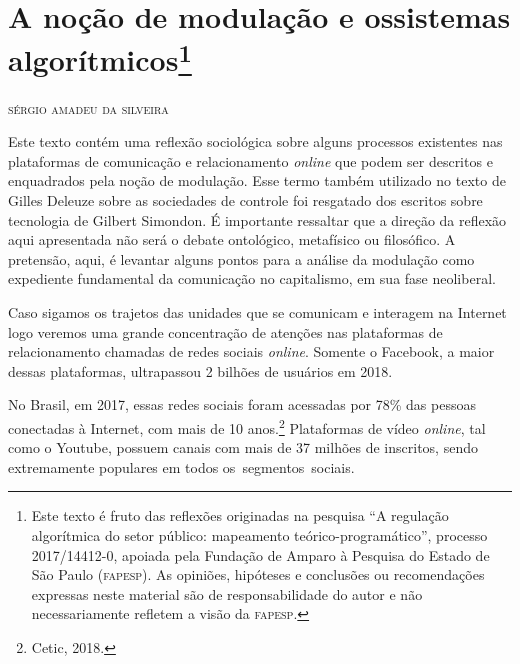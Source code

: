 \chapter*{A noção de modulação e os\break sistemas algorítmicos\footnote{Este texto é fruto das reflexões originadas na pesquisa ``A regulação algorítmica do setor público: mapeamento teórico-programático'', processo 2017/14412-0, apoiada pela Fundação de Amparo à Pesquisa do Estado de São Paulo (\textsc{fapesp}). As opiniões, hipóteses e conclusões ou recomendações expressas neste material são de responsabilidade do autor e não necessariamente refletem a visão da \textsc{fapesp}.}}


\begin{flushright}
\textsc{sérgio amadeu da silveira}
\end{flushright}


\noindent{}Este texto contém uma reflexão sociológica sobre alguns processos
existentes nas plataformas de comunicação e relacionamento \textit{online} que
podem ser descritos e enquadrados pela noção de modulação. Esse termo
também utilizado no texto de Gilles Deleuze sobre as sociedades de
controle foi resgatado dos escritos sobre tecnologia de Gilbert
Simondon. É importante ressaltar que a direção da reflexão aqui
apresentada não será o debate ontológico, metafísico ou filosófico. A
pretensão, aqui, é levantar alguns pontos para a análise da modulação
como expediente fundamental da comunicação no capitalismo, em sua fase
neoliberal.

Caso sigamos os trajetos das unidades que se comunicam e interagem na
Internet logo veremos uma grande concentração de atenções nas
plataformas de relacionamento chamadas de redes sociais \textit{online}. Somente
o Facebook, a maior dessas plataformas, ultrapassou 2 bilhões de
usuários em 2018. 

No Brasil, em 2017, essas redes sociais foram acessadas
por 78\% das pessoas conectadas à Internet, com mais de 10 anos.\footnote{Cetic,
2018.} Plataformas de vídeo \textit{online}, tal como o Youtube, possuem canais
com mais de 37 milhões de inscritos, sendo extremamente populares em
todos os~segmentos~sociais. 

